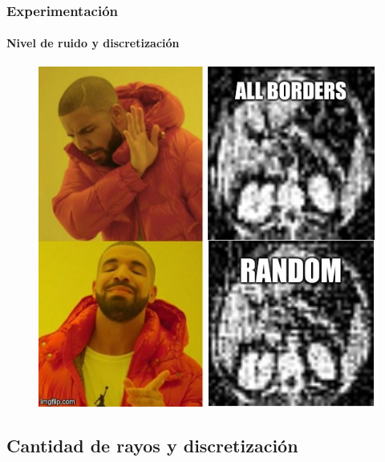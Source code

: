 \documentclass{beamer}
\begin{document}
\begin{frame}
  \frametitle{Experimentación}
  \framesubtitle{Nivel de ruido y discretización}
  \begin{figure}[H]
    \centering
    \includegraphics[height=0.75\textheight]{imagenes/meme.jpg}
  \end{figure}
\end{frame}

\subsection{Cantidad de rayos y discretización}
\end{document}
